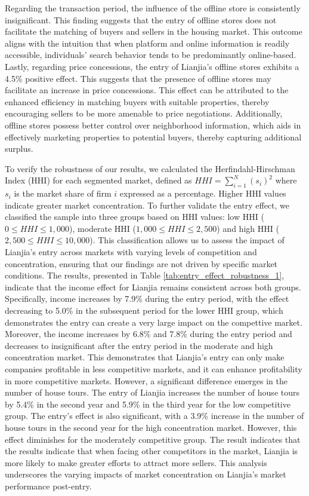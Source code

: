 \documentclass[11pt]{article}
\begin{document}
Regarding the transaction period, the influence of the offline store is consistently insignificant. This finding suggests that the entry of offline stores does not facilitate the matching of buyers and sellers in the housing market. This outcome aligns with the intuition that when platform and online information is readily accessible, individuals' search behavior tends to be predominantly online-based. Lastly, regarding price concessions, the entry of Lianjia's offline stores exhibits a 4.5\% positive effect. This suggests that the presence of offline stores may facilitate an increase in price concessions. This effect can be attributed to the enhanced efficiency in matching buyers with suitable properties, thereby encouraging sellers to be more amenable to price negotiations. Additionally, offline stores possess better control over neighborhood information, which aids in effectively marketing properties to potential buyers, thereby capturing additional surplus. 

To verify the robustness of our results, we calculated the Herfindahl-Hirschman Index (HHI) for each segmented market, defined as $HHI = \sum_{i=1}^N (s_i)^2$ where $s_i$ is the market share of firm $i$ expressed as a percentage. Higher HHI values indicate greater market concentration. To further validate the entry effect, we classified the sample into three groups based on HHI values: low HHI ($0 \leq HHI \leq 1,000$), moderate HHI ($1,000 \leq HHI \leq 2,500$) and high HHI ($2,500 \leq HHI \leq 10,000$). This classification allows us to assess the impact of Lianjia's entry across markets with varying levels of competition and concentration, ensuring that our findings are not driven by specific market conditions. The results, presented in Table \ref{tab:entry_effect_robustness_1}, indicate that the income effect for Lianjia remains consistent across both groups. Specifically, income increases by 7.9\% during the entry period, with the effect decreasing to 5.0\% in the subsequent period for the lower HHI group, which demonstrates the entry can create a very large impact on the compettive market. Moreover, the income increases by 6.8\% and 7.8\% during the entry period and decreases to insignificant after the entry period in the moderate and high concentration market. This demonstrates that Lianjia's entry can only make companies profitable in less competitive markets, and it can enhance profitability in more competitive markets. However, a significant difference emerges in the number of house tours. The entry of Lianjia increases the number of house tours by 5.4\% in the second year and 5.9\% in the third year for the low competitive group. The entry's effect is also significant, with a 3.9\% increase in the number of house tours in the second year for the high concentration market. However, this effect diminishes for the moderately competitive group. The result indicates that the results indicate that when facing other competitors in the market, Lianjia is more likely to make greater efforts to attract more sellers. This analysis underscores the varying impacts of market concentration on Lianjia's market performance post-entry.
\end{document}
